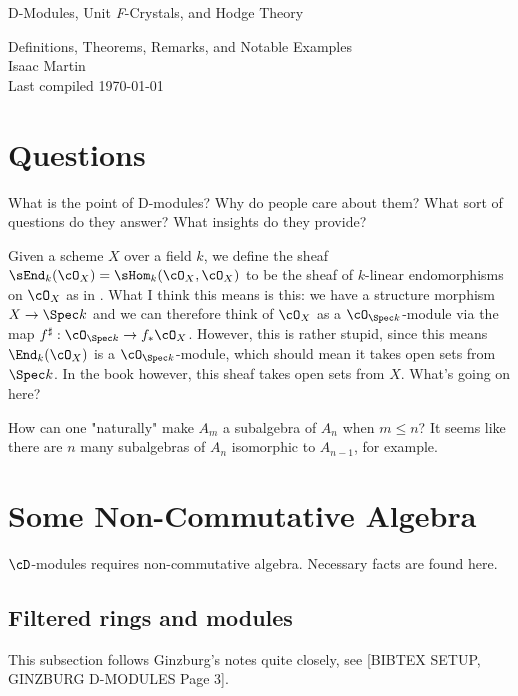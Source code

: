 


\begin{center}
	\Large
	\begin{LARGE}
		D-Modules, Unit \textit{F}-Crystals, and Hodge Theory \\
	\end{LARGE}
	Definitions, Theorems, Remarks, and Notable Examples \\
	Isaac Martin \\
    Last compiled \today
\end{center}
\normalsize
\vspace{-2mm}
\hru

\tableofcontents
\newpage
\section{Questions}
\begin{question}\label{q:D-mod-why-care}
	What is the point of D-modules? Why do people care about them? What sort of questions do they answer? What insights do they provide?
\end{question}
\begin{question}\label{q:sheaf-of-k-linear-endo}
	Given a scheme $X$ over a field $k$, we define the sheaf $\sEnd_k(\cO_X) = \sHom_k(\cO_X,\cO_X)$ to be the sheaf of $k$-linear endomorphisms on $\cO_X$ as in \cite[Definition 0.3]{Gieseker75}. What I think this means is this: we have a structure morphism $X \to \Spec k$ and we can therefore think of $\cO_X$ as a $\cO_{\Spec k}$-module via the map $f^\sharp:\cO_{\Spec k}\to f_*\cO_X$. However, this is rather stupid, since this means $\End_k(\cO_X)$ is a $\cO_{\Spec k}$-module, which should mean it takes open sets from $\Spec k$. In the book \cite[Example A.4.2.]{D-mod_PS_RT} however, this sheaf takes open sets from $X$. What's going on here?
\end{question}

\begin{question}\label{q:why-Weyl-subalgebra-natural}
	How can one "naturally" make $A_m$ a subalgebra of $A_n$ when $m \leq n$? It seems like there are $n$ many subalgebras of $A_n$ isomorphic to $A_{n-1}$, for example.
\end{question}
\section{Some Non-Commutative Algebra}
$\cD$-modules requires non-commutative algebra. Necessary facts are found here.
\subsection{Filtered rings and modules}
This subsection follows Ginzburg's notes quite closely, see [BIBTEX SETUP, GINZBURG D-MODULES Page 3]. 

